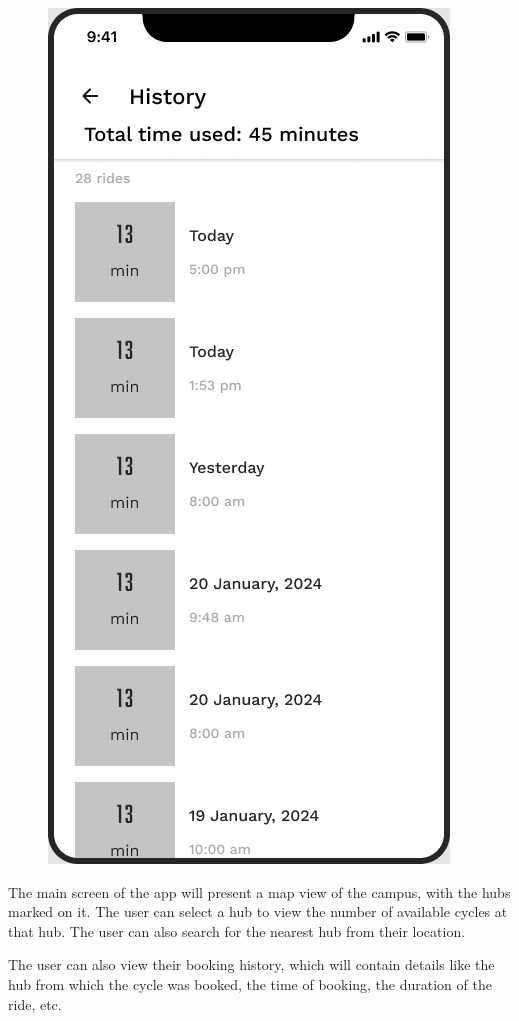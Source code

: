 \documentclass{scrreprt}
\begin{document}
\begin{figure}[h]
    \includegraphics[scale=0.3]{history-ui.png}
\end{figure}

The main screen of the app will present a map view of the campus, with the hubs marked on it. The user can select a hub to view the number of available cycles at that hub. The user can also search for the nearest hub from their location. 

The user can also view their booking history, which will contain details like the hub from which the cycle was booked, the time of booking, the duration of the ride, etc.
\end{document}
